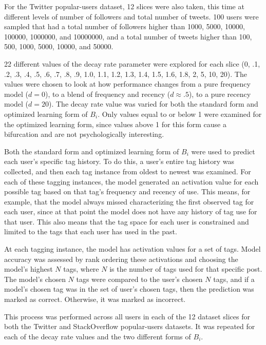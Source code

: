 \documentclass[man,floatsintext,donotrepeattitle]{apa6}
\begin{document}
For the Twitter popular-users dataset, 12 slices were also taken, this time at different levels of number of followers and total number of tweets.
100 users were sampled that had a total number of followers higher than \num{1000}, \num{5000}, \num{10000}, \num{100000}, \num{1000000}, and \num{10000000},
and a total number of tweets higher than \num{100}, \num{500}, \num{1000}, \num{5000}, \num{10000}, and \num{50000}.

22 different values of the decay rate parameter were explored for each slice
(0, .1, .2, .3, .4, .5, .6, .7, .8, .9, 1.0, 1.1, 1.2, 1.3, 1.4, 1.5, 1.6, 1.8, 2, 5, 10, 20).
The values were chosen to look at how performance changes from a pure frequency model ($d=0$), to a blend of frequency and recency ($d \approx .5$), to a pure recency model ($d=20$).
The decay rate value was varied for both the standard form and optimized learning form of $B_{i}$. 
Only values equal to or below 1 were examined for the optimized learning form, since values above 1 for this form cause a bifurcation and are not psychologically interesting.

Both the standard form and optimized learning form of $B_{i}$ were used to predict each user's specific tag history.
To do this, a user's entire tag history was collected, and then each tag instance from oldest to newest was examined.
For each of these tagging instances, the model generated an activation value for each possible tag based on that tag's frequency and recency of use. 
This means, for example, that the model always missed characterizing the first observed tag for each user, since at that point the model does not have any history of tag use for that user.
This also means that the tag space for each user is constrained and limited to the tags that each user has used in the past.

At each tagging instance, the model has activation values for a set of tags.
Model accuracy was assessed by rank ordering these activations and choosing the model's highest $N$ tags, where $N$ is the number of tags used for that specific post.
The model's chosen $N$ tags were compared to the user's chosen $N$ tags, and if a model's chosen tag was in the set of user's chosen tags, then the prediction was marked as correct.
Otherwise, it was marked as incorrect.

This process was performed across all users in each of the 12 dataset slices for both the Twitter and StackOverflow popular-users datasets.
It was repeated for each of the decay rate values and the two different forms of $B_{i}$.
\end{document}
